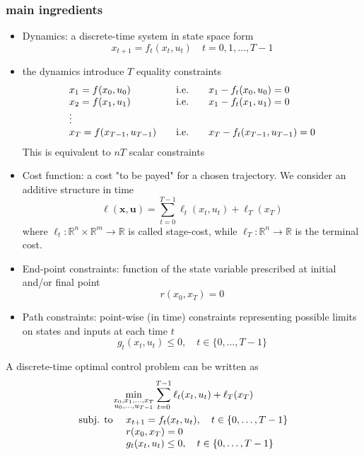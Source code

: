 \documentclass{book}
\newcommand{\R}{\mathbb{R}}
\theoremstyle{definition}
\theoremstyle{remark}
\theoremstyle{remark}
\begin{document}
\subsubsection{main ingredients}
\begin{itemize}
    \item Dynamics: a discrete-time system in state space form 
        \[
            x_{t+1} = f_t(x_t,u_t) \quad t=0,1,\dots,T-1
        \]
    \item the dynamics introduce $T$ equality constraints 
        \[
            \begin{array}{l l l}
                x_1 = f(x_0,u_0) & \quad \text{i.e.} \quad& x_1-f_t(x_0,u_0)=0 \\
                x_2 = f(x_1,u_1) & \quad \text{i.e.} \quad & x_1-f_t(x_1,u_1)=0 \\
                \vdots \\
                x_T = f(x_{T-1},u_{T-1}) & \quad \text{i.e.} \quad & x_T-f_t(x_{T-1},u_{T-1})=0 \\
            \end{array}
        \] 
        This is equivalent to $nT$ scalar constraints
    \item Cost function: a cost "to be payed" for a chosen trajectory. We consider an additive structure in time 
        \[
            \ell(\mathbf{x},\mathbf{u}) = \displaystyle\sum_{t=0}^{T-1}\ell_t(x_t,u_t)+\ell_T(x_T)
        \]
        where $\ell_t:\R^n\times\R^m\to\R$ is called stage-cost, while $\ell_T:\R^n\to\R$ is the terminal cost. 
    \item End-point constraints: function of the state variable prescribed at initial and/or final point 
        \[
            r(x_0,x_T)=0
        \]
    \item Path constraints: point-wise (in time) constraints representing possible limits on states and inputs at each time $t$ 
        \[
            g_t(x_t,u_t)\leq 0, \quad t\in\{0,\dots,T-1\}
        \]
\end{itemize}

A discrete-time optimal control problem can be written as 
\begin{gather*}
    \min_{\substack{x_0,x_1,\dots,x_T\\u_0,\dots,u_{T-1}}} \displaystyle\sum_{t=0}^{T-1}\ell_t(x_t,u_t)+\ell_T(x_T)\\
    \begin{array}{l l }
        \text{subj. to } & x_{t+1}=f_t(x_t,u_t), \quad t\in\{0,\dots,T-1\}\\
                         & r(x_0,x_T) = 0  \\
                         & g_t(x_t,u_t)\leq 0, \quad t\in\{0,\dots,T-1\}
    \end{array}
\end{gather*}
\end{document}
